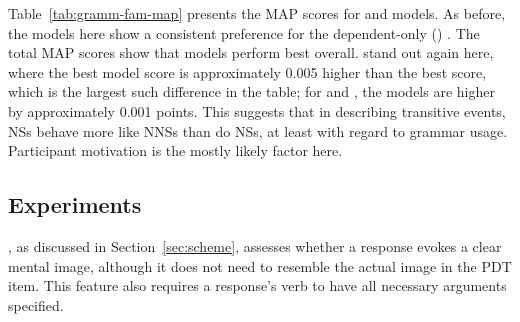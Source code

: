 Table~\ref{tab:gramm-fam-map} presents the  MAP scores for  and  models. As before, the models here show a consistent preference for the dependent-only () . The total MAP scores show that  models perform best overall.  stand out again here, where the best  model score is approximately 0.005 higher than the best  score, which is the largest such difference in the table; for  and , the  models are higher by approximately 0.001 points. This suggests that in describing transitive events,  NSs behave more like NNSs than do  NSs, at least with regard to grammar usage. Participant motivation is the mostly likely factor here.

\subsection{ Experiments}
\label{sec:map-interp}

, as discussed in Section~\ref{sec:scheme}, assesses whether a response evokes a clear mental image, although it does not need to resemble the actual image in the PDT item. This feature also requires a response's verb to have all necessary arguments specified.

